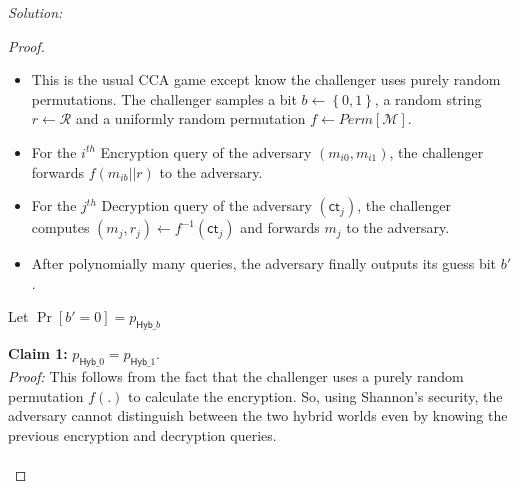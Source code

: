 \documentclass[a4paper, 11pt]{article}
\newenvironment{solution}
    {\textit{Solution:}}
    {\clearpage}
\newcommand{\bit}{\left\{0, 1\right\}}
\newcommand{\ct}{\mathsf{ct}}
\newcommand{\hyb}{\mathsf{Hyb}}
\newcommand{\calM}{\mathcal{M}}
\newcommand{\calR}{\mathcal{R}}
\begin{document}
\begin{solution}
\begin{enumerate}[(a)]
\begin{proof}
                  \begin{world}
                      \begin{itemize}
                          \item This is the usual CCA game except know the challenger uses purely random permutations. The challenger samples a bit $b \leftarrow \bit$, a random string $r \leftarrow \calR$ and a uniformly random permutation $f \leftarrow Perm[\calM]$.
                          \item For the $i^{th}$ Encryption query of the adversary $(m_{i0}, m_{i1})$, the challenger forwards $f(m_{ib}||r)$ to the adversary.
                          \item For the $j^{th}$ Decryption query of the adversary $(\ct_{j})$, the challenger computes $(m_j, r_j) \leftarrow f^{-1}(\ct_j)$ and forwards $m_j$ to the adversary.
                          \item After polynomially many queries, the adversary finally outputs its guess bit $b'$.
                      \end{itemize}
                      Let $\Pr[b' = 0] = p_{\hyb\_b}$
                  \end{world}

                  \textbf{Claim 1:} $p_{\hyb\_0} = p_{\hyb\_1}$. \\
                  \textit{Proof:} This follows from the fact that the challenger uses a purely random permutation $f(.)$ to calculate the encryption. So, using Shannon's security, the adversary cannot distinguish between the two hybrid worlds even by knowing the previous encryption and decryption queries. \\ \\


\end{proof}
\end{enumerate}
\end{solution}
\end{document}
